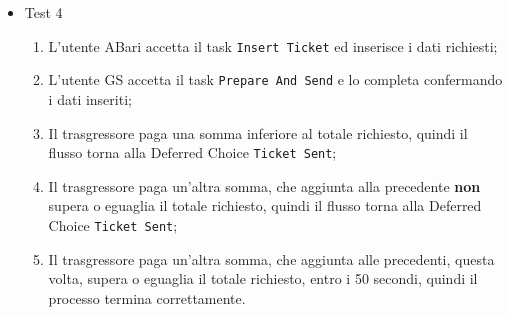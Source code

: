 \documentclass[../Relazione.tex]{subfiles}
\begin{document}
\begin{itemize}
        \item Test 4
        \begin{enumerate}
            \item L'utente ABari accetta il task \texttt{Insert Ticket} ed inserisce i dati richiesti;
            \item L'utente GS accetta il task \texttt{Prepare And Send} e lo completa confermando i dati inseriti;
            \item Il trasgressore paga una somma inferiore al totale richiesto, quindi il flusso torna alla Deferred Choice \texttt{Ticket Sent};
            \item Il trasgressore paga un'altra somma, che aggiunta alla precedente \textbf{non} supera o eguaglia il totale richiesto, quindi il flusso torna alla Deferred Choice \texttt{Ticket Sent};
            \item Il trasgressore paga un'altra somma, che aggiunta alle precedenti, questa volta, supera o eguaglia il totale richiesto, entro i 50 secondi, quindi il processo termina correttamente.
        \end{enumerate}
    \end{itemize}
    
\end{document}
